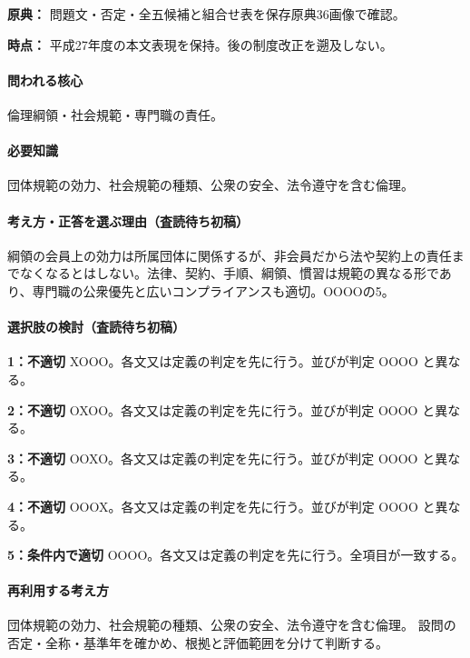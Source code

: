 \noindent\textbf{原典：} 問題文・否定・全五候補と組合せ表を保存原典36画像で確認。\par

\noindent\textbf{時点：} 平成27年度の本文表現を保持。後の制度改正を遡及しない。\par

\paragraph{問われる核心} 倫理綱領・社会規範・専門職の責任。

\paragraph{必要知識} 団体規範の効力、社会規範の種類、公衆の安全、法令遵守を含む倫理。

\paragraph{考え方・正答を選ぶ理由（査読待ち初稿）} 綱領の会員上の効力は所属団体に関係するが、非会員だから法や契約上の責任までなくなるとはしない。法律、契約、手順、綱領、慣習は規範の異なる形であり、専門職の公衆優先と広いコンプライアンスも適切。OOOOの5。

\paragraph{選択肢の検討（査読待ち初稿）}\mbox{}\par

\noindent\textbf{1：不適切} XOOO。各文又は定義の判定を先に行う。並びが判定 OOOO と異なる。\par

\noindent\textbf{2：不適切} OXOO。各文又は定義の判定を先に行う。並びが判定 OOOO と異なる。\par

\noindent\textbf{3：不適切} OOXO。各文又は定義の判定を先に行う。並びが判定 OOOO と異なる。\par

\noindent\textbf{4：不適切} OOOX。各文又は定義の判定を先に行う。並びが判定 OOOO と異なる。\par

\noindent\textbf{5：条件内で適切} OOOO。各文又は定義の判定を先に行う。全項目が一致する。\par

\paragraph{再利用する考え方} 団体規範の効力、社会規範の種類、公衆の安全、法令遵守を含む倫理。 設問の否定・全称・基準年を確かめ、根拠と評価範囲を分けて判断する。

